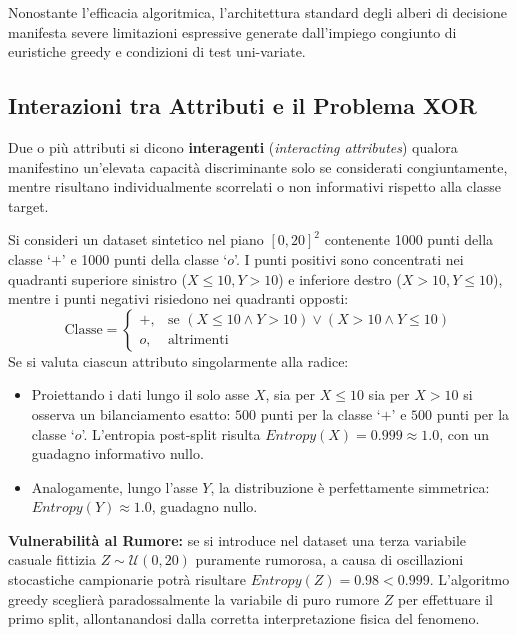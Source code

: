 Nonostante l'efficacia algoritmica, l'architettura standard degli alberi di decisione manifesta severe limitazioni espressive generate dall'impiego congiunto di euristiche greedy e condizioni di test uni-variate.

\FloatBarrier
\subsection{Interazioni tra Attributi e il Problema XOR}
\label{subsec:dm-xor-interaction}

Due o più attributi si dicono \textbf{interagenti} (\textit{interacting attributes}) qualora manifestino un'elevata capacità discriminante solo se considerati congiuntamente, mentre risultano individualmente scorrelati o non informativi rispetto alla classe target.

\begin{example}
Si consideri un dataset sintetico nel piano $[0, 20]^2$ contenente 1000 punti della classe `$+$' e 1000 punti della classe `$o$'. I punti positivi sono concentrati nei quadranti superiore sinistro ($X \le 10, Y > 10$) e inferiore destro ($X > 10, Y \le 10$), mentre i punti negativi risiedono nei quadranti opposti:
\begin{equation}
    \text{Classe} = \begin{cases} 
        +, & \text{se } (X \le 10 \wedge Y > 10) \vee (X > 10 \wedge Y \le 10) \\
        o, & \text{altrimenti}
    \end{cases}
\end{equation}
Se si valuta ciascun attributo singolarmente alla radice:
\begin{itemize}
    \item Proiettando i dati lungo il solo asse $X$, sia per $X \le 10$ sia per $X > 10$ si osserva un bilanciamento esatto: $500$ punti per la classe `$+$' e $500$ punti per la classe `$o$'. L'entropia post-split risulta $Entropy(X) = 0.999 \approx 1.0$, con un guadagno informativo nullo.
    \item Analogamente, lungo l'asse $Y$, la distribuzione è perfettamente simmetrica: $Entropy(Y) \approx 1.0$, guadagno nullo.
\end{itemize}
\textbf{Vulnerabilit\`a al Rumore:} se si introduce nel dataset una terza variabile casuale fittizia $Z \sim \mathcal{U}(0, 20)$ puramente rumorosa, a causa di oscillazioni stocastiche campionarie potrà risultare $Entropy(Z) = 0.98 < 0.999$. L'algoritmo greedy sceglierà paradossalmente la variabile di puro rumore $Z$ per effettuare il primo split, allontanandosi dalla corretta interpretazione fisica del fenomeno.
\end{example}

